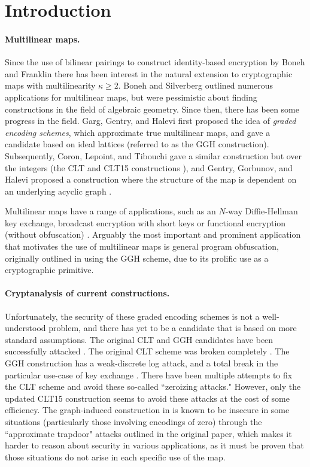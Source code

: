 \section{Introduction}

\paragraph{Multilinear maps.} Since the use of bilinear pairings to construct identity-based encryption by Boneh and Franklin \cite{bf} there has been interest in the natural extension to cryptographic maps with multilinearity $\kappa \geq 2$.  Boneh and Silverberg \cite{bs} outlined numerous applications for multilinear maps, but were pessimistic about finding constructions in the field of algebraic geometry.  Since then, there has been some progress in the field.  Garg, Gentry, and Halevi \cite{ggh13a} first proposed the idea of \textit{graded encoding schemes}, which approximate true multilinear maps, and gave a candidate based on ideal lattices (referred to as the GGH construction).  Subsequently, Coron, Lepoint, and Tibouchi gave a similar construction but over the integers (the CLT and CLT15 constructions \cite{clt, clt15}), and Gentry, Gorbunov, and Halevi proposed a construction where the structure of the map is dependent on an underlying acyclic graph \cite{ggh14a}.

Multilinear maps have a range of applications, such as an $N$-way Diffie-Hellman key exchange, broadcast encryption with short keys \cite{bs} or functional encryption (without obfuscation) \cite{blr}.  Arguably the most important and prominent application that motivates the use of multilinear maps is general program obfuscation, originally outlined in \cite{ggh13b} using the GGH scheme, due to its prolific use as a cryptographic primitive.

\paragraph{Cryptanalysis of current constructions.}  Unfortunately, the security of these graded encoding schemes is not a well-understood problem, and there has yet to be a candidate that is based on more standard assumptions.  The original CLT and GGH candidates have been successfully attacked \cite{chl, cgh, hj}.  The original CLT scheme was broken completely \cite{chl, cgh}.  The GGH construction has a weak-discrete log attack, and a total break in the particular use-case of key exchange \cite{cgh, hj}.  There have been multiple attempts to fix the CLT scheme \cite{bwz, clt14, clt15} and avoid these so-called ``zeroizing attacks."  However, only the updated CLT15 construction \cite{clt15} seems to avoid these attacks at the cost of some efficiency.  The graph-induced construction in \cite{ggh14a} is known to be insecure in some situations (particularly those involving encodings of zero) through the ``approximate trapdoor" attacks outlined in the original paper, which makes it harder to reason about security in various applications, as it must be proven that those situations do not arise in each specific use of the map.

